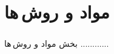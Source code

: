 
\chapter[مواد و روش\,ها]{\centering مواد و روش\,ها } \label{chapter:proposed-method}

\paragraph*{}
بخش مواد و روش\,ها ............